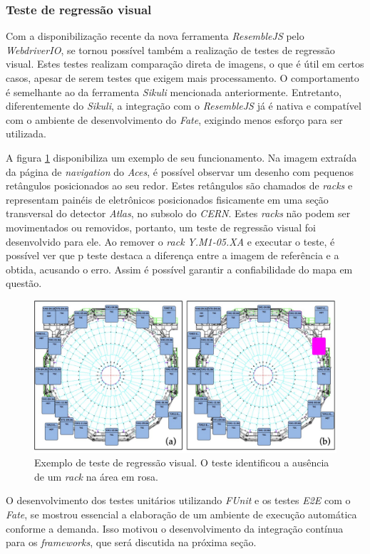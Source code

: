 \hypertarget{teste-de-regressao-visual}{%
\subsubsection{Teste de regressão visual}\label{teste-de-regressao-visual}}

Com a disponibilização recente da nova ferramenta \emph{ResembleJS} pelo \emph{WebdriverIO}, se tornou possível também a realização de testes de regressão visual. Estes testes realizam comparação direta de imagens, o que é útil em certos casos, apesar de serem testes que exigem mais processamento. O comportamento é semelhante ao da ferramenta \emph{Sikuli} mencionada anteriormente. Entretanto, diferentemente do \emph{Sikuli}, a integração com o \emph{ResembleJS} já é nativa e compatível com o ambiente de desenvolvimento do \emph{Fate}, exigindo menos esforço para ser utilizada.

A figura \ref{fig:aces-example-2} disponibiliza um exemplo de seu funcionamento. Na imagem extraída da página de \emph{navigation} do \emph{Aces}, é possível observar um desenho com pequenos retângulos posicionados ao seu redor. Estes retângulos são chamados de \emph{racks} e representam painéis de eletrônicos posicionados fisicamente em uma seção transversal do detector \emph{Atlas}, no subsolo do \emph{CERN}. Estes \emph{racks} não podem ser movimentados ou removidos, portanto, um teste de regressão visual foi desenvolvido para ele. Ao remover o \emph{rack} \emph{Y.M1-05.XA} e executar o teste, é possível ver que p teste destaca a diferença entre a imagem de referência e a obtida, acusando o erro. Assim é possível garantir a confiabilidade do mapa em questão.

\begin{figure}[H]
    \centering
    \includegraphics[width=13cm]{source/4-solucao/images/aces-example-2.png}
    \caption{Exemplo de teste de regressão visual. O teste identificou a ausência de um \emph{rack} na área em rosa.}
    \label{fig:aces-example-2}
\end{figure}

O desenvolvimento dos testes unitários utilizando \emph{FUnit} e os testes \emph{E2E} com o \emph{Fate}, se mostrou essencial a elaboração de um ambiente de execução automática conforme a demanda. Isso motivou o desenvolvimento da integração contínua para os \emph{frameworks}, que será discutida na próxima seção.
